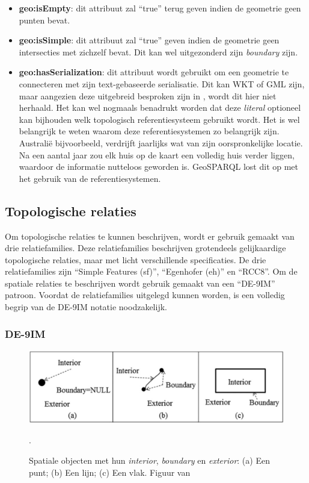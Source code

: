 \begin{itemize}
    \item \textbf{geo:isEmpty}: dit attribuut zal ``true'' terug geven indien de geometrie geen punten bevat.
    \item \textbf{geo:isSimple}: dit attribuut zal ``true'' geven indien de geometrie geen intersecties met zichzelf bevat. Dit kan wel uitgezonderd zijn \textit{boundary} zijn.
    \item \textbf{geo:hasSerialization}: dit attribuut wordt gebruikt om een geometrie te connecteren met zijn text-gebaseerde serialisatie. Dit kan WKT of GML zijn, maar aangezien deze uitgebreid besproken zijn in , wordt dit hier niet herhaald. Het kan wel nogmaals benadrukt worden dat deze \textit{literal} optioneel kan bijhouden welk topologisch referentiesysteem gebruikt wordt. Het is wel belangrijk te weten waarom deze referentiesystemen zo belangrijk zijn. Australië bijvoorbeeld, verdrijft jaarlijks wat van zijn oorspronkelijke locatie. Na een aantal jaar zou elk huis op de kaart een volledig huis verder liggen, waardoor de informatie nutteloos geworden is. GeoSPARQL lost dit op met het gebruik van de referentiesystemen.
\end{itemize}


\subsection{Topologische relaties}
Om topologische relaties te kunnen beschrijven, wordt er gebruik gemaakt van drie relatiefamilies. Deze relatiefamilies beschrijven grotendeels gelijkaardige topologische relaties, maar met licht verschillende specificaties. De drie relatiefamilies zijn ``Simple Features (sf)'', ``Egenhofer (eh)'' en ``RCC8''. Om de spatiale relaties te beschrijven wordt gebruik gemaakt van een ``DE-9IM'' patroon. Voordat de relatiefamilies uitgelegd kunnen worden, is een volledig begrip van de DE-9IM notatie noodzakelijk.

\subsubsection{DE-9IM}
\begin{figure}[ht]
    \centering
    \includegraphics[width=0.9\linewidth]{images/spatial_objects_DE-9IM.png}
    \caption{Spatiale objecten met hun \textit{interior}, \textit{boundary} en \textit{exterior}: (a) Een punt; (b) Een lijn; (c) Een vlak. Figuur van \cite{shen2018classification}}.
    \label{fig:de-9im}
\end{figure}

